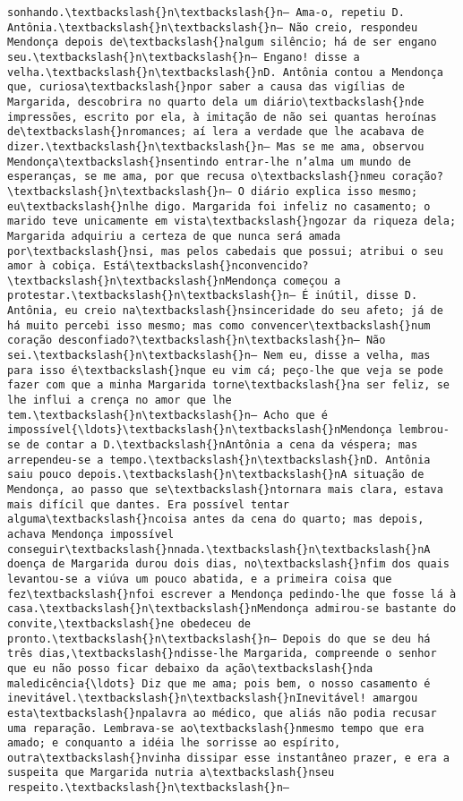 \begin{Verbatim}[commandchars=\\\{\}]
sonhando.\textbackslash{}n\textbackslash{}n— Ama-o, repetiu D. Antônia.\textbackslash{}n\textbackslash{}n— Não creio, respondeu Mendonça depois de\textbackslash{}nalgum silêncio; há de ser engano seu.\textbackslash{}n\textbackslash{}n— Engano! disse a velha.\textbackslash{}n\textbackslash{}nD. Antônia contou a Mendonça que, curiosa\textbackslash{}npor saber a causa das vigílias de Margarida, descobrira no quarto dela um diário\textbackslash{}nde impressões, escrito por ela, à imitação de não sei quantas heroínas de\textbackslash{}nromances; aí lera a verdade que lhe acabava de dizer.\textbackslash{}n\textbackslash{}n— Mas se me ama, observou Mendonça\textbackslash{}nsentindo entrar-lhe n’alma um mundo de esperanças, se me ama, por que recusa o\textbackslash{}nmeu coração?\textbackslash{}n\textbackslash{}n— O diário explica isso mesmo; eu\textbackslash{}nlhe digo. Margarida foi infeliz no casamento; o marido teve unicamente em vista\textbackslash{}ngozar da riqueza dela; Margarida adquiriu a certeza de que nunca será amada por\textbackslash{}nsi, mas pelos cabedais que possui; atribui o seu amor à cobiça. Está\textbackslash{}nconvencido?\textbackslash{}n\textbackslash{}nMendonça começou a protestar.\textbackslash{}n\textbackslash{}n— É inútil, disse D. Antônia, eu creio na\textbackslash{}nsinceridade do seu afeto; já de há muito percebi isso mesmo; mas como convencer\textbackslash{}num coração desconfiado?\textbackslash{}n\textbackslash{}n— Não sei.\textbackslash{}n\textbackslash{}n— Nem eu, disse a velha, mas para isso é\textbackslash{}nque eu vim cá; peço-lhe que veja se pode fazer com que a minha Margarida torne\textbackslash{}na ser feliz, se lhe influi a crença no amor que lhe tem.\textbackslash{}n\textbackslash{}n— Acho que é impossível{\ldots}\textbackslash{}n\textbackslash{}nMendonça lembrou-se de contar a D.\textbackslash{}nAntônia a cena da véspera; mas arrependeu-se a tempo.\textbackslash{}n\textbackslash{}nD. Antônia saiu pouco depois.\textbackslash{}n\textbackslash{}nA situação de Mendonça, ao passo que se\textbackslash{}ntornara mais clara, estava mais difícil que dantes. Era possível tentar alguma\textbackslash{}ncoisa antes da cena do quarto; mas depois, achava Mendonça impossível conseguir\textbackslash{}nnada.\textbackslash{}n\textbackslash{}nA doença de Margarida durou dois dias, no\textbackslash{}nfim dos quais levantou-se a viúva um pouco abatida, e a primeira coisa que fez\textbackslash{}nfoi escrever a Mendonça pedindo-lhe que fosse lá à casa.\textbackslash{}n\textbackslash{}nMendonça admirou-se bastante do convite,\textbackslash{}ne obedeceu de pronto.\textbackslash{}n\textbackslash{}n— Depois do que se deu há três dias,\textbackslash{}ndisse-lhe Margarida, compreende o senhor que eu não posso ficar debaixo da ação\textbackslash{}nda maledicência{\ldots} Diz que me ama; pois bem, o nosso casamento é inevitável.\textbackslash{}n\textbackslash{}nInevitável! amargou esta\textbackslash{}npalavra ao médico, que aliás não podia recusar uma reparação. Lembrava-se ao\textbackslash{}nmesmo tempo que era amado; e conquanto a idéia lhe sorrisse ao espírito, outra\textbackslash{}nvinha dissipar esse instantâneo prazer, e era a suspeita que Margarida nutria a\textbackslash{}nseu respeito.\textbackslash{}n\textbackslash{}n— 
\end{Verbatim}
